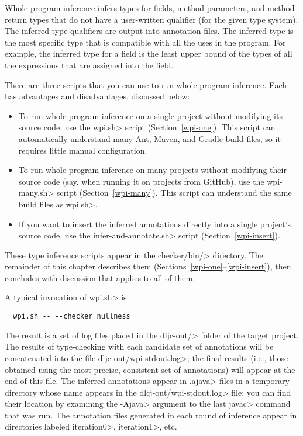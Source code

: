 
Whole-program inference
infers types for fields, method parameters, and method return types that do not
have a user-written qualifier (for the given type system).
The inferred type qualifiers are output into annotation files.
The inferred type is the most specific type that is compatible with all the
uses in the program.  For example, the inferred type for a field is the
least upper bound of the types of all the expressions that are assigned
into the field.

There are three scripts that you can use to run whole-program inference.
Each has advantages and disadvantages, discussed below:

\begin{itemize}
    \item
    To run whole-program inference on a single project without modifying its source code,
    use the \<wpi.sh> script (Section~\ref{wpi-one}). This script can automatically understand
    many Ant, Maven, and Gradle build files, so it requires little manual configuration.

    \item
    To run whole-program inference on many projects without modifying their source code
    (say, when running it on projects from GitHub), use the \<wpi-many.sh> script (Section~\ref{wpi-many}).
    This script can understand the same build files as \<wpi.sh>.

    \item
    If you want to insert the inferred annotations directly into a single
    project's source code, use the \<infer-and-annotate.sh> script (Section~\ref{wpi-insert}).
\end{itemize}

These type inference scripts appear in the \<checker/bin/> directory.
The remainder of this chapter describes them
(Sections~\ref{wpi-one}--\ref{wpi-insert}), then concludes with discussion
that applies to all of them.



A typical invocation of \<wpi.sh> is

\begin{Verbatim}
  wpi.sh -- --checker nullness
\end{Verbatim}

The result is a set of log files placed in the \<dljc-out/> folder of the
target project. The results of type-checking with each candidate set of
annotations will be concatenated into the file \<dljc-out/wpi-stdout.log>; the final
results (i.e., those obtained using the most precise, consistent set of annotations)
will appear at the end of this file.
The inferred annotations appear in \<.ajava> files in a
temporary directory whose name appears in the \<dlcj-out/wpi-stdout.log> file;
you can find their location by examining the \<-Ajava> argument
to the last \<javac> command that was run. The annotation files generated in
each round of inference appear in directories labeled \<iteration0>, \<iteration1>, etc.


